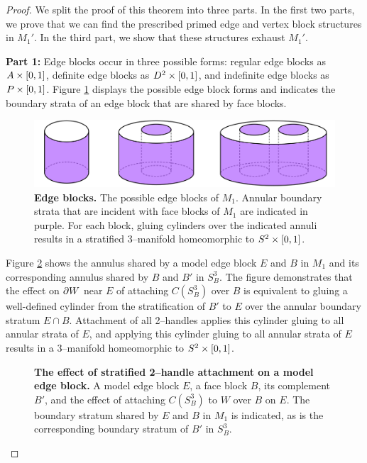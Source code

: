 \begin{proof}
	We split the proof of this theorem into three parts.
	In the first two parts, we prove that we can find the prescribed primed edge and vertex block structures in $M_1'$.
	In the third part, we show that these structures exhaust $M_1'$.
	
	\textbf{Part 1:}
	Edge blocks occur in three possible forms: regular edge blocks as $A\times[0,1]$, definite edge blocks as $D^2\times[0,1]$, and indefinite edge blocks as $P\times[0,1]$.
	Figure \ref{fig:edge-block-incidence} displays the possible edge block forms and indicates the boundary strata of an edge block that are shared by face blocks.
	
	\begin{figure}[h!]
		\centering
		\includegraphics[width=\textwidth]{figures/edge-block-incidence.png}
		\caption{
			\textbf{Edge blocks.}
			The possible edge blocks of $M_1$.
			Annular boundary strata that are incident with face blocks of $M_1$ are indicated in purple.
			For each block, gluing cylinders over the indicated annuli results in a stratified 3--manifold homeomorphic to $S^2\times[0,1]$.
		}
		\label{fig:edge-block-incidence}
	\end{figure}
	
	Figure \ref{fig:edge-face-shared-boundary} shows the annulus shared by a model edge block $E$ and $B$ in $M_1$ and its corresponding annulus shared by $B$ and $B'$ in $S_B^3$.
	The figure demonstrates that the effect on $\partial W$ near $E$ of attaching $C(S_B^3)$ over $B$ is equivalent to gluing a well-defined cylinder from the stratification of $B'$  to $E$ over the annular boundary stratum $E\cap B$.
	Attachment of all 2--handles applies this cylinder gluing to all annular strata of $E$, and applying this cylinder gluing to all annular strata of $E$ results in a 3--manifold homeomorphic to $S^2\times[0,1]$.

	\begin{figure}[h!]
		\caption{
			\textbf{The effect of stratified 2--handle attachment on a model edge block.}
			A model edge block $E$, a face block $B$, its complement $B'$, and the effect of attaching $C(S_B^3)$ to $W$ over $B$ on $E$.
			The boundary stratum shared by $E$ and $B$ in $M_1$ is indicated, as is the corresponding boundary stratum of $B'$ in $S_B^3$.
		}
		\label{fig:edge-face-shared-boundary}
	\end{figure}
	

\end{proof}
